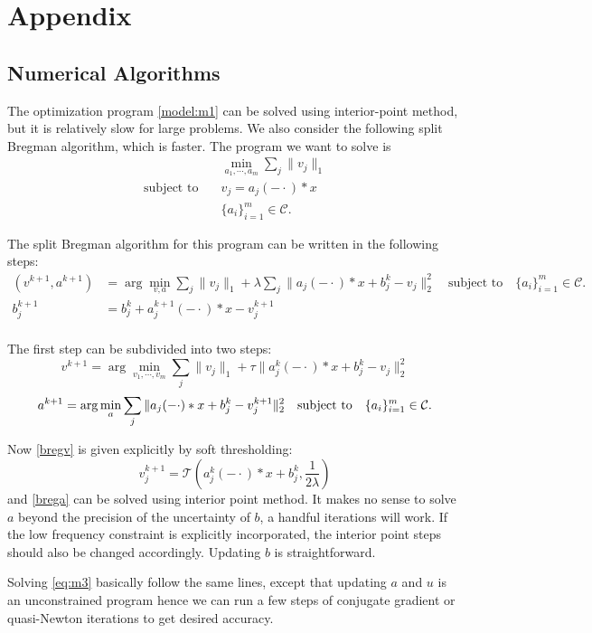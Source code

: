 \documentclass[a4paper]{article}
\begin{document}
\section{Appendix}
\subsection{Numerical Algorithms}

The optimization program \eqref{model:m1} can be solved using interior-point method, but it is relatively slow for large problems. We also consider the following split Bregman algorithm, which is faster. The program we want to solve is 
\begin{equation}
\begin{aligned}
&\min_{a_1,\cdots,a_m} \sum_j \|v_j\|_1 \\
\textrm{subject to} \quad & v_j = a_j(-\cdot)*x \\
	& \{a_i\}_{i=1}^m \in \mathcal{C}.
	\end{aligned}
\end{equation}

The split Bregman algorithm for this program can be written in the following steps:
\begin{equation}
\label{breg:all}
\begin{aligned}
	(v^{k+1},a^{k+1}) &=\arg\min_{v,a} \sum_j \|v_j\|_1 + \lambda\sum_j\|a_j(-\cdot)*x+b_j^k-v_j\|_2^2 \quad\textrm{subject to} \quad \{a_i\}_{i=1}^m \in \mathcal{C}.\\
	b_j^{k+1} &= b_j^k + a_j^{k+1}(-\cdot)*x - v_j^{k+1} \\
\end{aligned}
\end{equation}

The first step can be subdivided into two steps:
\begin{equation}
\label{bregv}
		v^{k+1}  = \arg\min_{v_1,\cdots,v_m}  \sum_j \|v_j\|_1 + \tau \|a^k_j(-\cdot)*x +b^k_j -v_j\|_2^2
\end{equation}
\begin{equation}
\label{brega}
a^{k+1} =\arg\min_a \sum_j \|a_j(-\cdot)*x+b^{k}_j-v^{k+1}_j\|_2^2   \quad\textrm{subject to} \quad \{a_i\}_{i=1}^m \in \mathcal{C}.\\
\end{equation}

Now \eqref{bregv} is given explicitly by soft thresholding:
\begin{equation}
	v^{k+1}_j = \mathcal{T}(a^k_j(-\cdot)*x+b^k_j,\frac{1}{2\lambda})
\end{equation}
and \eqref{brega} can be solved using interior point method. It makes no sense to solve $a$ beyond the precision of the uncertainty of $b$, a handful iterations will work. If the low frequency constraint is explicitly incorporated, the interior point steps should also be changed accordingly. Updating $b$ is straightforward.

Solving \eqref{eq:m3} basically follow the same lines, except that updating $a$ and $u$ is an unconstrained program hence we can run a few steps of conjugate gradient or quasi-Newton iterations to get desired accuracy.












\end{document}
